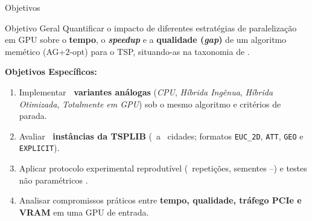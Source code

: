 \begin{frame}{Objetivos}
  \begin{block}{Objetivo Geral}
    Quantificar o impacto de diferentes estratégias de paralelização em GPU sobre o \textbf{tempo}, o \textbf{\emph{speedup}} e a \textbf{qualidade (\emph{gap})} de um algoritmo memético (AG+$2$-opt) para o TSP, situando-as na taxonomia de \textcite{crainic2003parallel,crainic2010parallel}.
  \end{block}

  \vspace{0.12cm}
  {\small\textbf{Objetivos Específicos:}}
  \begin{enumerate}
    \small
    \item Implementar \textbf{\totalvariantes\ variantes análogas} (\emph{CPU}, \emph{Híbrida Ingênua}, \emph{Híbrida Otimizada}, \emph{Totalmente em GPU}) sob o mesmo algoritmo e critérios de parada.
    \item Avaliar \textbf{\totalinstancias\ instâncias da TSPLIB} (\menorinstancia\ a \maiorinstancia\ cidades; formatos \texttt{EUC\_2D}, \texttt{ATT}, \texttt{GEO} e \texttt{EXPLICIT}).
    \item Aplicar protocolo experimental reprodutível (\totalrepeticoes\ repetições, sementes \sementeinicial--\sementefinal) e testes não paramétricos \autocite{demsar2006statistical}.
    \item Analisar compromissos práticos entre \textbf{tempo, qualidade, tráfego PCIe e VRAM} em uma GPU de entrada.
  \end{enumerate}
\end{frame}

